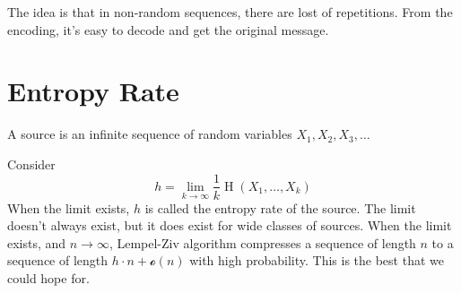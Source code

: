 \documentclass{article}
\begin{document}
The idea is that in non-random sequences, there are lost of repetitions. From the encoding, it's easy to decode and get the original message.

\section{Entropy Rate}

A source is an infinite sequence of random variables $X_1,X_2,X_3,\ldots$

Consider 
\[
h=\lim_{k\to \infty} \frac{1}{k}\operatorname{H}\left(X_1,\ldots, X_k\right)
\]
When the limit exists, $h$ is called the entropy rate of the source. The limit doesn't always exist, but it does exist for wide classes of sources. When the limit exists, and $n\to \infty$, Lempel-Ziv algorithm compresses a sequence of length $n$ to a sequence of length $h\cdot n+\mathcal{o}(n)$ with high probability. This is the best that we could hope for.
\end{document}
